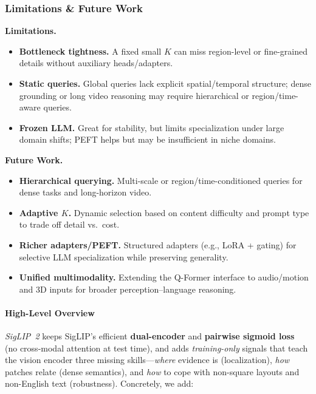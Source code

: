 \begin{enrichment}
\begin{enrichment}
        \subsubsection{Limitations \& Future Work}
        \textbf{Limitations.}
        \begin{itemize}
            \item \textbf{Bottleneck tightness.} A fixed small $K$ can miss region-level or fine-grained details without auxiliary heads/adapters.
            \item \textbf{Static queries.} Global queries lack explicit spatial/temporal structure; dense grounding or long video reasoning may require hierarchical or region/time-aware queries.
            \item \textbf{Frozen LLM.} Great for stability, but limits specialization under large domain shifts; PEFT helps but may be insufficient in niche domains.
        \end{itemize}
        \textbf{Future Work.}
        \begin{itemize}
            \item \textbf{Hierarchical querying.} Multi-scale or region/time-conditioned queries for dense tasks and long-horizon video.
            \item \textbf{Adaptive $K$.} Dynamic selection based on content difficulty and prompt type to trade off detail vs.\ cost.
            \item \textbf{Richer adapters/PEFT.} Structured adapters (e.g., LoRA + gating) for selective LLM specialization while preserving generality.
            \item \textbf{Unified multimodality.} Extending the Q-Former interface to audio/motion and 3D inputs for broader perception--language reasoning.
        \end{itemize}
        
    \end{enrichment}
    
    \newpage
    
    \begin{enrichment}
        \label{enr:subsec_chapter24_siglip2}
        
        \paragraph{High-Level Overview}
        \emph{SigLIP~2} keeps SigLIP’s efficient \textbf{dual-encoder} and \textbf{pairwise sigmoid loss}~\cite{zhai2023_siglip} (no cross-modal attention at test time), and adds \emph{training-only} signals that teach the vision encoder three missing skills—\emph{where} evidence is (localization), \emph{how} patches relate (dense semantics), and \emph{how} to cope with non-square layouts and non-English text (robustness). Concretely, we add:
        

\end{enrichment}
\end{enrichment}

